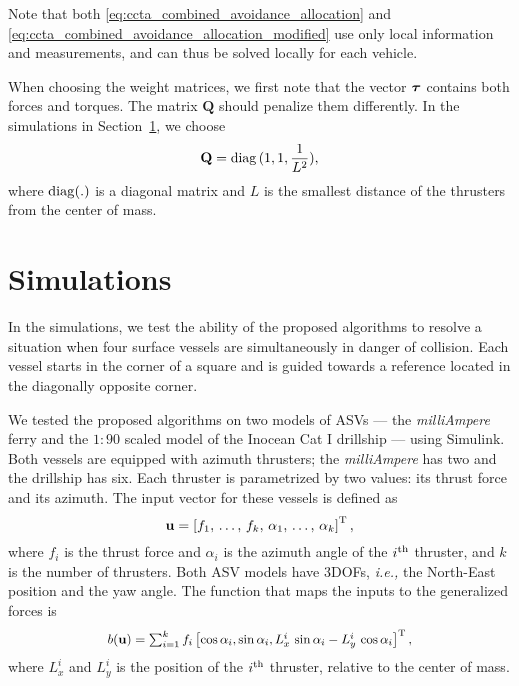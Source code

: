 Note that both \eqref{eq:ccta_combined_avoidance_allocation} and \eqref{eq:ccta_combined_avoidance_allocation_modified} use only local information and measurements, and can thus be solved locally for each vehicle.

When choosing the weight matrices, we first note that the vector $\bm{\tau}$ contains both forces and torques.
The matrix $\mathbf{Q}$ should penalize them differently.
In the simulations in Section~\ref{sec:ccta_simulations}, we choose
\begin{equation}
   \mathbf{Q} = \operatorname*{diag}{(1,1,\frac{1}{L^2})},
\end{equation}
where $\operatorname*{diag}(.)$ is a diagonal matrix and $L$ is the smallest distance of the thrusters from the center of mass.

\section{Simulations}
\label{sec:ccta_simulations}
In the simulations, we test the ability of the proposed algorithms to resolve a situation when four surface vessels are simultaneously in danger of collision.
Each vessel starts in the corner of a square and is guided towards a reference located in the diagonally opposite corner.

We tested the proposed algorithms on two models of ASVs --- the \emph{milliAmpere} ferry \cite{pedersen_optimization_2019} and the $1:90$ scaled model of the Inocean Cat I drillship \cite{bjorno_thruster-assisted_2016} --- using Simulink.
Both vessels are equipped with azimuth thrusters; the \emph{milliAmpere} has two and the drillship has six.
Each thruster is parametrized by two values: its thrust force and its azimuth.
The input vector for these vessels is defined as \vspace{-2mm}
\begin{equation}
    \mathbf{u} = \left[ f_1 ,\, \ldots ,\, f_k ,\, \alpha_1 ,\, \ldots ,\, \alpha_k \right]^{\rm T},
\end{equation}
where $f_i$ is the thrust force and $\alpha_i$ is the azimuth angle of the $i^{\rm th}$ thruster, and $k$ is the number of thrusters.
%
Both ASV models have 3DOFs, \emph{i.e.,} the North-East position and the yaw angle.
The function that maps the inputs to the generalized forces is \vspace{-2mm}
\begin{equation}
    \scale[0.93]{b(\mathbf{u}) = \sum_{i=1}^k f_i \left[ \cos\alpha_i, \sin\alpha_i, L_x^i\,\sin\alpha_i - L_y^i\,\cos\alpha_i \right]^{\rm T},}
\end{equation}
where $L_x^i$ and $L_y^i$ is the position of the $i^{\rm th}$ thruster, relative to the center of mass.

